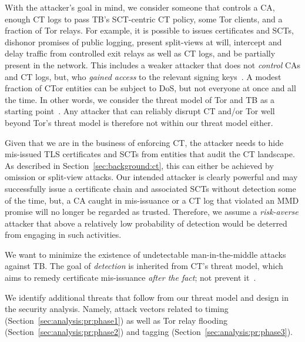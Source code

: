With
the attacker's goal in mind, we consider someone that controls
	a CA,
	enough CT logs to pass TB's SCT-centric CT policy, 
	some Tor clients, and
	a fraction of Tor relays.
For example, it is possible to
	issues certificates and SCTs,
	dishonor promises of public logging,
	present split-views at will,
	intercept and delay traffic from controlled exit relays as well as CT logs,
		and
	be partially present in the network.
This includes a weaker attacker that does not \emph{control} CAs and CT logs,
but, who \emph{gained access} to the relevant signing keys~\cite{turktrust,%
gdca1-omission}.  A modest fraction of CTor entities can be subject to DoS, but
not everyone at once and all the time.  In other words, we consider the threat
model of Tor and TB as a starting point~\cite{tor,tor-browser}.  Any
attacker that can reliably disrupt CT and/or Tor well beyond Tor's threat
model is therefore not within our threat model either.

%
%
Given that we are in the business of enforcing CT, the attacker needs to hide
mis-issued TLS certificates and SCTs from entities that audit the CT landscape.
As described in Section~\ref{sec:background:ct}, this can either be achieved by
omission or split-view attacks.  Our intended attacker is clearly powerful and may
successfully issue a certificate chain and associated SCTs without detection
some of the time, but, a CA caught in mis-issuance or a CT log that violated an
MMD promise will no longer be regarded as trusted.  Therefore, we assume a
\emph{risk-averse} attacker that above a relatively low probability of detection
would be deterred from engaging in such activities.

%
%
We want to minimize the existence of undetectable man-in-the-middle attacks
against TB.  The goal of \emph{detection} is inherited from CT's threat
model, which aims to remedy certificate mis-issuance \emph{after the fact}; not
prevent it~\cite{ct/a}.

%
%
We identify additional threats that follow from our threat model and design
in the security analysis.  Namely, attack vectors related to
	timing (Section~\ref{sec:analysis:pr:phase1}) as well as
	Tor relay flooding (Section~\ref{sec:analysis:pr:phase2}) and
        tagging (Section~\ref{sec:analysis:pr:phase3}).
        
